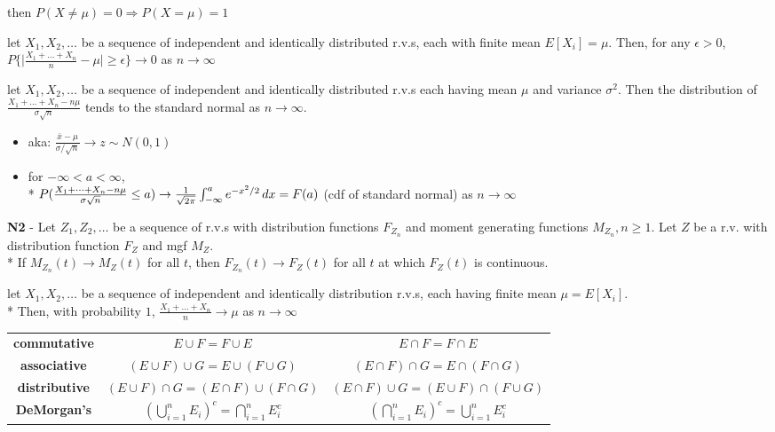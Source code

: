 \documentclass[10pt, landscape]{article}
\begin{document}
\begin{multicols*}{3}
\begin{niceproof}
      then $P(X \neq \mu) = 0 \Rightarrow P(X = \mu) = 1$
    \end{niceproof}

    let $X_1, X_2, \dots$ be a sequence of independent and identically distributed r.v.s, each with finite mean  $E[X_i] = \mu$. 
    Then, for any $\epsilon > 0$, 
    $P \{ \vert \frac{X_1 + \dots + X_n}{n} - \mu \vert \geq \epsilon \} \to 0 $ as $n \to \infty$

    let $X_1, X_2, \dots$ be a sequence of independent and identically distributed r.v.s each having mean $\mu$ and variance $\sigma^2$. 
    Then the distribution of $\frac{X_1 + \dots + X_n - n\mu}{\sigma \sqrt{n}}$ tends to the standard normal as $n \to \infty$.

    \begin{itemize}
      \item aka: $\frac{\bar{x} - \mu}{\sigma/\sqrt{n}} \to z \sim N(0, 1)$
      \item for $-\infty < a < \infty$, 
        \\* $P (\frac{X_1 + \dots + X_n - n\mu}{\sigma \sqrt{n}} \leq a) \to \frac{1}{\sqrt{2\pi}} \int^a_{-\infty} e^{-x^2/2} \mathop{dx} = F(a) $ (cdf of standard normal) as $n \to \infty$
    \end{itemize}

    \textbf{N2} - Let $Z_1, Z_2, \dots$ be a sequence of r.v.s with distribution functions $F_{Z_n}$ and moment generating functions $M_{Z_n}, n \geq 1$.
    Let $Z$ be a r.v. with distribution function $F_Z$ and mgf $M_Z$. 
    \\* If $M_{Z_n} (t) \to M_Z(t)$ for all $t$, then $F_{Z_n}(t) \to F_Z(t)$ for all $t$ at which $F_Z(t)$ is continuous.

    let $X_1, X_2, \dots$ be a sequence of independent and identically distribution r.v.s, each having finite mean $\mu = E[X_i]$. 
    \\* Then, with probability  $1$, 
    $\frac{X_1 + \dots + X_n}{n} \to \mu$ as $n \to \infty$

\end{multicols*}

\begin{center}
  \begin{tabular}{ccc}
    \textbf{commutative} & $E \cup F = F \cup E$ & $E \cap F = F \cap E$ \\
    \textbf{associative} & $(E \cup F) \cup G = E \cup (F \cup G)$ &  $(E \cap F) \cap G = E \cap (F \cap G)$ \\
    \textbf{distributive} & $(E \cup F) \cap G = (E \cap F) \cup (F \cap G)$ & $(E \cap F) \cup G = (E \cup F) \cap (F \cup G)$ \\
    \textbf{DeMorgan's} & $(\bigcup\limits^n_{i=1} E_i)^c = \bigcap\limits^n_{i=1}E_i^c$ & $(\bigcap\limits^n_{i=1}E_i)^c = \bigcup\limits^n_{i=1}E_i^c$ \\
  \end{tabular}
\end{center}
\end{document}
